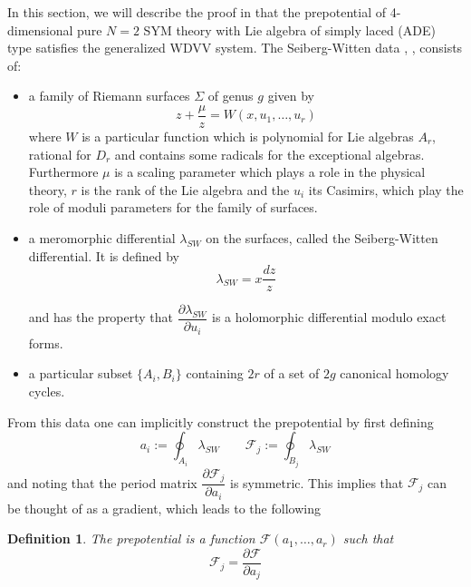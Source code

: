 \documentclass[a4paper,11pt]{article}
\newtheorem{definition}[theorem]{Definition}
\numberwithin{equation}{section}
\begin{document}
In this section, we will describe the proof in \cite{ITO-YANG:1998} 
that the prepotential of 4-dimensional pure $N=2$ SYM theory
with Lie algebra of simply laced (ADE) type satisfies the generalized WDVV
system. The Seiberg-Witten data \cite{SEIB-WITT1:1994}, \cite
{GORS-KRIC-MARS-MIRO-MORO:1995}, \cite{MART-WARN:1996} consists of:

\bigskip

\begin{itemize}
\item  a family of Riemann surfaces $\Sigma$ of genus $g$ given by 
\begin{equation}
z+\dfrac{\mu }{z}=W(x,u_{1},\ldots ,u_{r})  \label{surface_ADE}
\end{equation}
where $W$ is a particular function which is polynomial for Lie algebras $%
A_{r}$, rational for $D_{r}$ and contains some radicals for the exceptional
algebras. Furthermore $\mu $ is a scaling parameter which plays a role in
the physical theory, $r$ is the rank of the Lie algebra and the $u_{i}$ its
Casimirs, which play the role of moduli parameters for the family of
surfaces.

\item  a meromorphic differential $\lambda _{SW}$ on the surfaces,
called the Seiberg-Witten differential. It is defined by 
\begin{equation}
\lambda _{SW}=x\dfrac{dz}{z}
\end{equation}

and has the property that $\dfrac{\partial \lambda _{SW}}{\partial u_{i}}$
is a holomorphic differential modulo exact forms.

\item  a particular subset $\{A_{i},B_{i}\}$ containing $2r$ of a set of $2g$
canonical homology cycles.
\end{itemize}

\bigskip

\bigskip

\noindent From this data one can implicitly construct the prepotential by
first defining 
\begin{equation}
a_{i}:=\oint_{A_{i}}\lambda _{SW}\qquad \mathcal{F}_{j}:=\oint_{B_{j}}%
\lambda _{SW}
\end{equation}
and noting that the period matrix $\dfrac{\partial \mathcal{F}_{j}}{\partial
a_{i}}$ is symmetric. This implies that $\mathcal{F}_{j}$ can be thought of
as a gradient, which leads to the following

\begin{definition}
The prepotential is a function $\mathcal{F}(a_{1},\ldots ,a_{r})$ such that 
\begin{equation}
\mathcal{F}_{j}=\dfrac{\partial \mathcal{F}}{\partial a_{j}}
\end{equation}
\end{definition}
\end{document}
